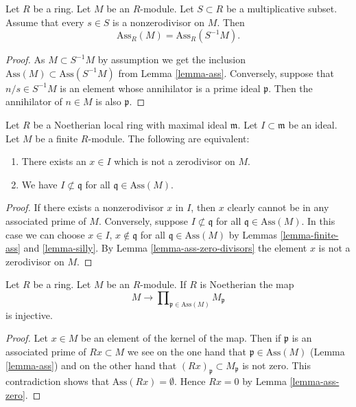 \begin{lemma}
\label{lemma-localize-ass-nonzero-divisors}
Let $R$ be a ring. Let $M$ be an $R$-module.
Let $S \subset R$ be a multiplicative subset.
Assume that every $s \in S$ is a nonzerodivisor on $M$.
Then
$$
\text{Ass}_R(M) = \text{Ass}_R(S^{-1}M).
$$
\end{lemma}

\begin{proof}
As $M \subset S^{-1}M$ by assumption we get the inclusion
$\text{Ass}(M) \subset \text{Ass}(S^{-1}M)$ from
Lemma \ref{lemma-ass}.
Conversely, suppose that $n/s \in S^{-1}M$ is an element whose
annihilator is a prime ideal $\mathfrak p$. Then the annihilator
of $n \in M$ is also $\mathfrak p$.
\end{proof}

\begin{lemma}
\label{lemma-ideal-nonzerodivisor}
Let $R$ be a Noetherian local ring with
maximal ideal $\mathfrak m$. Let $I \subset \mathfrak m$
be an ideal. Let $M$ be a finite $R$-module.
The following are equivalent:
\begin{enumerate}
\item There exists an $x \in I$ which is not a zerodivisor on $M$.
\item We have $I \not \subset \mathfrak q$ for all
$\mathfrak q \in \text{Ass}(M)$.
\end{enumerate}
\end{lemma}

\begin{proof}
If there exists a nonzerodivisor $x$ in $I$,
then $x$ clearly cannot be in any associated
prime of $M$. Conversely, suppose $I \not \subset \mathfrak q$
for all $\mathfrak q \in \text{Ass}(M)$. In this case we can
choose $x \in I$, $x \not \in \mathfrak q$ for all
$\mathfrak q \in \text{Ass}(M)$ by Lemmas
\ref{lemma-finite-ass} and \ref{lemma-silly}.
By Lemma \ref{lemma-ass-zero-divisors} the element $x$
is not a zerodivisor on $M$.
\end{proof}

\begin{lemma}
\label{lemma-zero-at-ass-zero}
Let $R$ be a ring. Let $M$ be an $R$-module. If $R$ is Noetherian
the map
$$
M
\longrightarrow
\prod\nolimits_{\mathfrak p \in \text{Ass}(M)} M_{\mathfrak p}
$$
is injective.
\end{lemma}

\begin{proof}
Let $x \in M$ be an element of the kernel of the map.
Then if $\mathfrak p$ is an associated prime of $Rx \subset M$
we see on the one hand that $\mathfrak p \in \text{Ass}(M)$
(Lemma \ref{lemma-ass}) and
on the other hand that $(Rx)_{\mathfrak p} \subset M_{\mathfrak p}$
is not zero. This contradiction shows that $\text{Ass}(Rx) = \emptyset$.
Hence $Rx = 0$ by
Lemma \ref{lemma-ass-zero}.
\end{proof}

